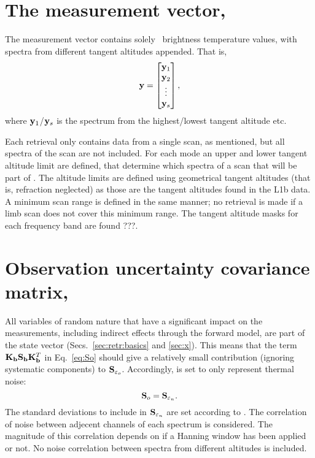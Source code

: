 \section{The measurement vector, \MsrVct}
\label{sec:y}
%
The measurement vector contains solely \smr\ brightness temperature values,
with spectra from different tangent altitudes appended. That is,
\begin{equation}
  \label{eq:y}
  \mathbf{y} =
  \begin{bmatrix}
    \mathbf{y}_1\\ 
    \mathbf{y}_2\\ 
    \vdots\\ 
    \mathbf{y}_s
  \end{bmatrix},
\end{equation}
where $\mathbf{y}_1$/$\mathbf{y}_s$ is the spectrum from the highest/lowest tangent
altitude etc. 

Each retrieval only contains data from a single scan, as mentioned, but all
spectra of the scan are not included. For each mode an upper and lower tangent
altitude limit are defined, that determine which spectra of a scan that will be
part of \MsrVct. The altitude limits are defined using geometrical tangent
altitudes (that is, refraction neglected) as those are the tangent altitudes
found in the L1b data. A minimum scan range is defined in the same manner; no
retrieval is made if a limb scan does not cover this minimum range. The tangent
altitude masks for each frequency band are found ???.



\section{Observation uncertainty covariance matrix, }
\label{sec:So}
%
All variables of random nature that have a significant impact on the
measurements, including indirect effects through the forward model, are part of
the state vector (Secs.~\ref{sec:retr:basics} and \ref{sec:x}). This means that
the term $\mathbf{K}_{\mathbf{b}}\mathbf{S}_{\mathbf{b}} \mathbf{K}_{\mathbf{b}}^T$ in
Eq.~\ref{eq:So} should give a relatively small contribution (ignoring
systematic components) to $\mathbf{S}_{\varepsilon_o}$. Accordingly,  is
set to only represent thermal noise:
\begin{equation}
  \mathbf{S}_{o} = \mathbf{S}_{\varepsilon_n}.
\end{equation}
The standard deviations to include in $\mathbf{S}_{\varepsilon_n}$ are set
according to \citet{atbdl1b}. The correlation of noise between adjecent
channels of each spectrum is considered. The magnitude of this correlation
depends on if a Hanning window has been applied or not. No noise correlation
between spectra from different altitudes is included.


